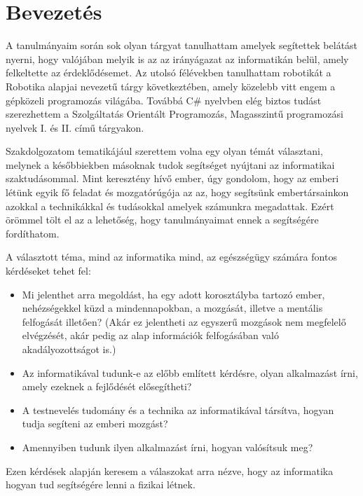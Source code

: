 \documentclass[tocnopagenum]{thesis-ekf}
\theoremstyle{definition}
\theoremstyle{remark}
\begin{document}
	\section*{Bevezetés}
	A tanulmányaim során sok olyan tárgyat tanulhattam amelyek segítettek belátást nyerni, hogy valójában melyik is az az irányágazat az informatikán belül, amely felkeltette az érdeklődésemet. Az utolsó félévekben tanulhattam robotikát a Robotika alapjai nevezetű tárgy következtében, amely közelebb vitt engem a gépközeli programozás világába. Továbbá C\# nyelvben elég biztos tudást szerezhettem a Szolgáltatás Orientált Programozás, Magasszintű programozási nyelvek I. és II. című tárgyakon.
	\par
	Szakdolgozatom tematikájául szerettem volna egy olyan témát választani, melynek a későbbiekben másoknak tudok segítséget nyújtani az informatikai szaktudásommal.
	Mint keresztény hívő ember, úgy gondolom, hogy az emberi létünk egyik fő feladat és mozgatórúgója az az, hogy segítsünk embertársainkon azokkal a technikákkal és tudásokkal amelyek számunkra megadattak. Ezért örömmel tölt el az a lehetőség, hogy tanulmányaimat ennek a segítségére fordíthatom. 
	\par
	A választott téma, mind az informatika mind, az egészségügy számára fontos kérdéseket tehet fel:
	\begin{itemize}
		\item  Mi jelenthet arra megoldást, ha egy adott korosztályba tartozó ember, nehézségekkel küzd a mindennapokban, a mozgását, illetve a mentális felfogását illetően? (Akár ez jelentheti az egyszerű mozgások nem megfelelő elvégzését, akár pedig az alap információk felfogásában való akadályozottságot is.)
		\item  Az informatikával tudunk-e az előbb említett kérdésre, olyan alkalmazást írni, amely ezeknek a fejlődését elősegítheti?
		\item A testnevelés tudomány és a technika az informatikával társítva, hogyan tudja segíteni az emberi mozgást?
		\item Amennyiben tudunk ilyen alkalmazást írni, hogyan valósítsuk meg?
	
	\end{itemize}
 	Ezen kérdések alapján keresem a válaszokat arra nézve, hogy az informatika hogyan tud segítségére lenni a fizikai létnek. 
 
\end{document}
